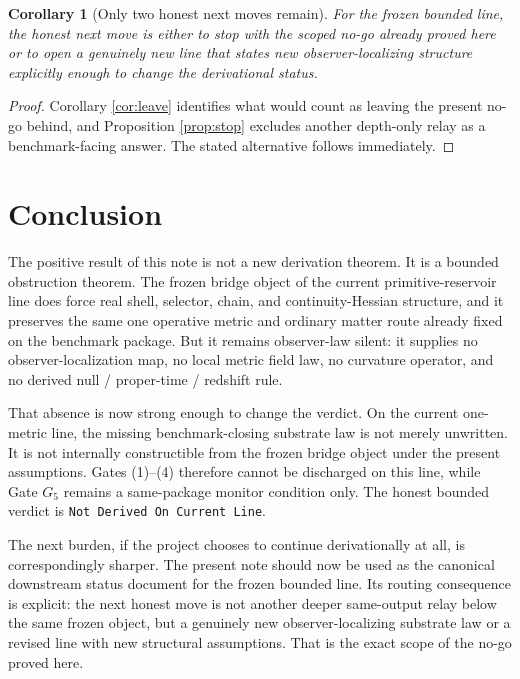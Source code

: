 \documentclass[11pt]{article}
\newcommand{\GateFive}{G_{5}}
\newtheorem{corollary}{Corollary}
\begin{document}
\begin{corollary}[Only two honest next moves remain]
For the frozen bounded line, the honest next move is either to stop with the scoped no-go already proved here or to open a genuinely new line that states new observer-localizing structure explicitly enough to change the derivational status.
\end{corollary}

\begin{proof}
Corollary \ref{cor:leave} identifies what would count as leaving the present no-go behind, and Proposition \ref{prop:stop} excludes another depth-only relay as a benchmark-facing answer. The stated alternative follows immediately.
\end{proof}

\section{Conclusion}

The positive result of this note is not a new derivation theorem. It is a bounded obstruction theorem. The frozen bridge object of the current primitive-reservoir line does force real shell, selector, chain, and continuity-Hessian structure, and it preserves the same one operative metric and ordinary matter route already fixed on the benchmark package. But it remains observer-law silent: it supplies no observer-localization map, no local metric field law, no curvature operator, and no derived null / proper-time / redshift rule.

That absence is now strong enough to change the verdict. On the current one-metric line, the missing benchmark-closing substrate law is not merely unwritten. It is not internally constructible from the frozen bridge object under the present assumptions. Gates (1)--(4) therefore cannot be discharged on this line, while Gate \(\GateFive\) remains a same-package monitor condition only. The honest bounded verdict is \texttt{Not Derived On Current Line}.

The next burden, if the project chooses to continue derivationally at all, is correspondingly sharper. The present note should now be used as the canonical downstream status document for the frozen bounded line. Its routing consequence is explicit: the next honest move is not another deeper same-output relay below the same frozen object, but a genuinely new observer-localizing substrate law or a revised line with new structural assumptions. That is the exact scope of the no-go proved here.
\end{document}
